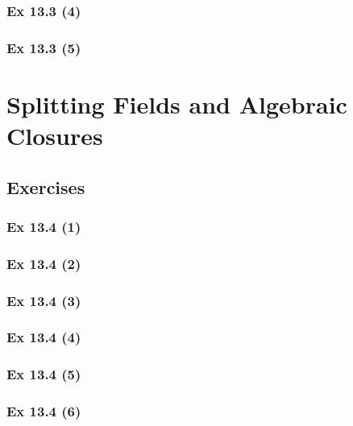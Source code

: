 \subsubsection{Ex 13.3 (4)}\label{sec:Ex_13.3.4}

\subsubsection{Ex 13.3 (5)}\label{sec:Ex_13.3.5}

\newpage		%

\section{Splitting Fields and Algebraic Closures}\label{sec:13.4}	
\subsection*{Exercises}\label{sec:13.4_Exercises}

\subsubsection{Ex 13.4 (1)}\label{sec:Ex_13.4.1}

\subsubsection{Ex 13.4 (2)}\label{sec:Ex_13.4.2}

\subsubsection{Ex 13.4 (3)}\label{sec:Ex_13.4.3}

\subsubsection{Ex 13.4 (4)}\label{sec:Ex_13.4.4}

\subsubsection{Ex 13.4 (5)}\label{sec:Ex_13.4.5}

\subsubsection{Ex 13.4 (6)}\label{sec:Ex_13.4.6}

